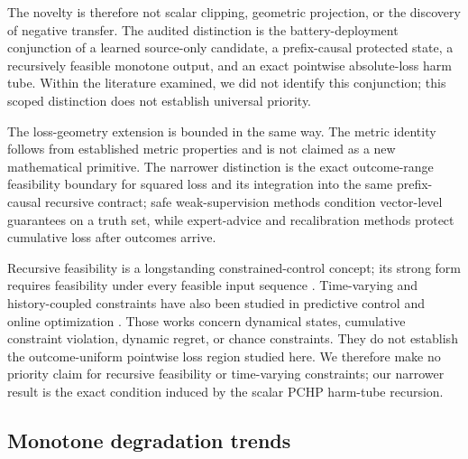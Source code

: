 \documentclass[11pt]{article}
\begin{document}
The novelty is therefore not scalar clipping, geometric projection, or the discovery of negative transfer. The audited distinction is the battery-deployment conjunction of a learned source-only candidate, a prefix-causal protected state, a recursively feasible monotone output, and an exact pointwise absolute-loss harm tube. Within the literature examined, we did not identify this conjunction; this scoped distinction does not establish universal priority.

The loss-geometry extension is bounded in the same way. The metric identity follows from established metric properties and is not claimed as a new mathematical primitive. The narrower distinction is the exact outcome-range feasibility boundary for squared loss and its integration into the same prefix-causal recursive contract; safe weak-supervision methods condition vector-level guarantees on a truth set, while expert-advice and recalibration methods protect cumulative loss after outcomes arrive.

Recursive feasibility is a longstanding constrained-control concept; its strong form requires feasibility under every feasible input sequence \citep{lofberg2012oops}. Time-varying and history-coupled constraints have also been studied in predictive control and online optimization \citep{li2021information,garber2024projectionfree,knaup2026recursively}. Those works concern dynamical states, cumulative constraint violation, dynamic regret, or chance constraints. They do not establish the outcome-uniform pointwise loss region studied here. We therefore make no priority claim for recursive feasibility or time-varying constraints; our narrower result is the exact condition induced by the scalar PCHP harm-tube recursion.

\subsection{Monotone degradation trends}
\end{document}
